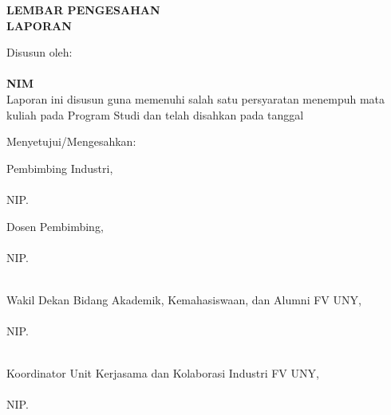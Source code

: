 
\newpage
{}
\begin{center}
    \begin{doublespace}
        \textbf{\large \MakeUppercase{lembar pengesahan}}\\
        \textbf{\large \MakeUppercase{Laporan {\tipe}}}
    \end{doublespace}
\end{center}

\begin{center}
    \begin{doublespace}
        \textbf{\large \MakeUppercase {\judulid}}
    \end{doublespace}
\end{center}

\begin{center}
    Disusun oleh:\\
    \textbf{\penulis}\\
    \textbf{NIM \nim}\\[1.5cm]

    Laporan ini disusun guna memenuhi salah satu persyaratan menempuh mata kuliah {\tipe} pada Program Studi {\prodi} {\fakultas} {\universitas} dan telah disahkan pada tanggal \tglpengesahan\\[0.75cm]
\end{center}

\begin{center}
    Menyetujui/Mengesahkan:\\
\end{center}

\begin{minipage}{0.35\textwidth}
    Pembimbing Industri,\\[2cm]
    \pembimbingindustri\\
    NIP. \NIKpembimbingindustri
\end{minipage}
\hfill
\begin{minipage}{0.47\textwidth}
    Dosen Pembimbing,\\[2cm]
    \pembimbing\\
    NIP. \NIPpembimbing
\end{minipage}%

\begin{minipage}{0.35\textwidth}
    \hfill\\[2em]
    Wakil Dekan Bidang Akademik, Kemahasiswaan, dan Alumni FV UNY,\\[2cm]
    \wakildekan\\
    NIP. \NIPwakildekan
\end{minipage}
\hfill
\begin{minipage}{0.47\textwidth}
    \hfill\\[2em]
    Koordinator Unit Kerjasama dan Kolaborasi Industri {\prodi} FV UNY,\\[2cm]
    \koordinatorUKKI\\
    NIP. \NIPkoordinatorUKKI
\end{minipage}%

